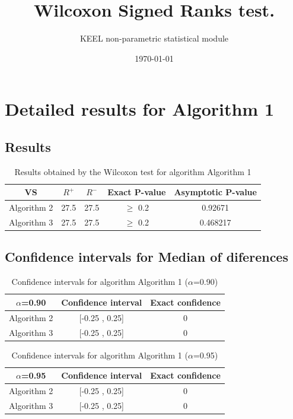 \documentclass[a4paper,10pt]{article}
\title{Wilcoxon Signed Ranks test.}
\date{\today}
\author{KEEL non-parametric statistical module}
\begin{document}
\pagestyle{empty}
\maketitle
\thispagestyle{empty}



\section{Detailed results for Algorithm 1}


\subsection{Results}

\begin{table}[!htp]
\centering\small
\begin{tabular}{
|c|c|c|c|c|}
\hline
 VS & $R^{+}$ & $R^{-}$ & Exact P-value & Asymptotic P-value \\ \hline 
Algorithm 2 & 27.5 & 27.5 & $\geq$ 0.2 & 0.92671\\ \hline 
Algorithm 3 & 27.5 & 27.5 & $\geq$ 0.2 & 0.468217\\ \hline 

\end{tabular}
\caption{Results obtained by the Wilcoxon test for algorithm Algorithm 1}
\end{table}

\subsection{Confidence intervals for Median of diferences}

\begin{table}[!htp]
\centering\small
\begin{tabular}{
|c|c|c|}
\hline
 $\alpha$=0.90 & Confidence interval & Exact confidence \\ \hline 
Algorithm 2 & [-0.25 , 0.25] & 0\\ \hline 
Algorithm 3 & [-0.25 , 0.25] & 0\\ \hline 

\end{tabular}
\caption{Confidence intervals for algorithm Algorithm 1 ($\alpha$=0.90)}
\end{table}
\begin{table}[!htp]
\centering\small
\begin{tabular}{
|c|c|c|}
\hline
 $\alpha$=0.95 & Confidence interval & Exact confidence \\ \hline 
Algorithm 2 & [-0.25 , 0.25] & 0\\ \hline 
Algorithm 3 & [-0.25 , 0.25] & 0\\ \hline 

\end{tabular}
\caption{Confidence intervals for algorithm Algorithm 1 ($\alpha$=0.95)}
\end{table}
\end{document}
